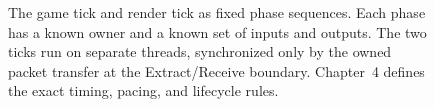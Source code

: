 \begin{figure}[!tb]
\caption{The game tick and render tick as fixed phase sequences. Each phase has a known owner and a known set of inputs and outputs. The two ticks run on separate threads, synchronized only by the owned packet transfer at the Extract/Receive boundary. Chapter~4 defines the exact timing, pacing, and lifecycle rules.}
\label{fig:main-loop-phases}
\end{figure}
\FloatBarrier
